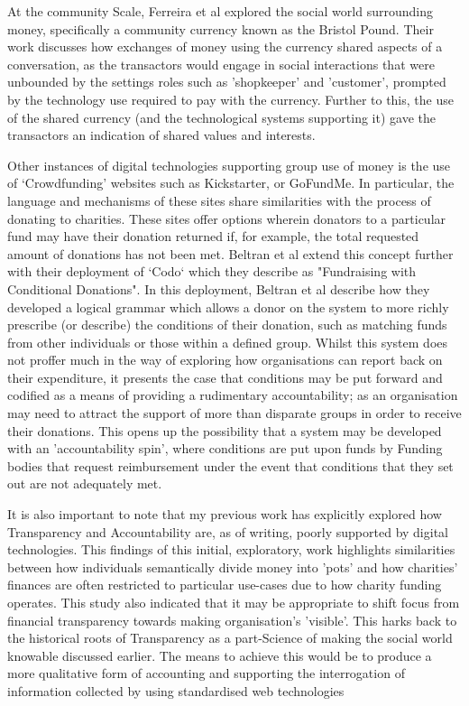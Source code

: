 At the community Scale, Ferreira et al explored the social world surrounding money, specifically a community currency known as the Bristol Pound. Their work discusses how exchanges of money using the currency shared aspects of a conversation, as the transactors would engage in social interactions that were unbounded by the settings roles such as 'shopkeeper' and 'customer', prompted by the technology use required to pay with the currency. Further to this, the use of the shared currency (and the technological systems supporting it) gave the transactors an indication of shared values and interests.

Other instances of digital technologies supporting group use of money is the use of `Crowdfunding' websites such as Kickstarter, or GoFundMe. In particular, the language and mechanisms of these sites share similarities with the process of donating to charities. These sites offer options wherein donators to a particular fund may have their donation returned if, for example, the total requested amount of donations has not been met. Beltran et al extend this concept further with their deployment of `Codo` which they describe as "Fundraising with Conditional Donations". In this deployment, Beltran et al describe how they developed a logical grammar which allows a donor on the system to more richly prescribe (or describe) the conditions of their donation, such as matching funds from other individuals or those within a defined group. Whilst this system does not proffer much in the way of exploring how organisations can report back on their expenditure, it presents the case that conditions may be put forward and codified as a means of providing a rudimentary accountability; as an organisation may need to attract the support of more than disparate groups in order to receive their donations. This opens up the possibility that a system may be developed with an 'accountability spin', where conditions are put upon funds by Funding bodies that request reimbursement under the event that conditions that they set out are not adequately met.

It is also important to note that my previous work has explicitly explored how Transparency and Accountability are, as of writing, poorly supported by digital technologies. This findings of this initial, exploratory, work highlights similarities between how individuals semantically divide money into 'pots' and how charities' finances are often restricted to particular use-cases due to how charity funding operates. This study also indicated that it may be appropriate to shift focus from financial transparency towards making organisation's 'visible'. This harks back to the historical roots of Transparency as a part-Science of making the social world knowable discussed earlier. The means to achieve this would be to produce a more qualitative form of accounting and supporting the interrogation of information collected by using standardised web technologies


